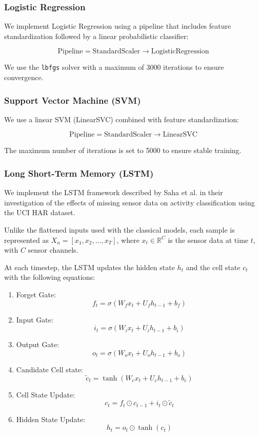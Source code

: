 \subsubsection{Logistic Regression}
We implement Logistic Regression using a pipeline that includes feature standardization followed by a linear probabilistic classifier:

\[
\text{Pipeline} = \text{StandardScaler} \rightarrow \text{LogisticRegression}
\]

We use the \texttt{lbfgs} solver with a maximum of 3000 iterations to ensure convergence.

\subsubsection{Support Vector Machine (SVM)}
We use a linear SVM (LinearSVC) combined with feature standardization:

\[
\text{Pipeline} = \text{StandardScaler} \rightarrow \text{LinearSVC}
\]

The maximum number of iterations is set to 5000 to ensure stable training.

\subsubsection{Long Short-Term Memory (LSTM)}
We implement the LSTM framework described by Saha et al. \cite{saha-2025} in their
investigation of the effects of missing sensor data on activity classification
using the UCI HAR dataset. %


Unlike the flattened inputs used with the classical models,
each sample is represented as $X_n=[x_1, x_2, ..., x_T]$,
where $x_t\in\mathbb{R}^C$ is the sensor data at time $t$,
with $C$ sensor channels.

At each timestep, the LSTM updates the hidden state $h_t$ and the cell state $c_t$
with the following equations:
\begin{enumerate}
\item Forget Gate:
\[
f_t = \sigma(W_f x_t + U_f h_{t-1} + b_f)
\]
\item Input Gate:
\[
i_t = \sigma(W_i x_t + U_i h_{t-1} + b_i)
\]
\item Output Gate:
\[
o_t = \sigma(W_o x_t + U_o h_{t-1} + b_o)
\]
\item Candidate Cell state:
\[
\tilde{c}_t = \tanh(W_c x_t + U_c h_{t-1} + b_c)
\]
\item Cell State Update:
\[
c_t = f_t \odot c_{t-1} + i_t \odot \tilde{c}_t
\]
\item Hidden State Update:
\[
h_t = o_t \odot \tanh(c_t)
\]
\end{enumerate}


